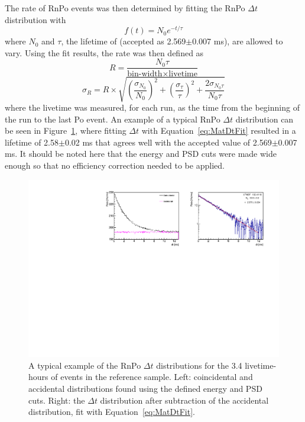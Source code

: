 The rate of RnPo events was then determined by fitting the RnPo $\Delta t$ distribution with
\begin{equation}
	f(t) = N_0e^{-t/\tau}
	\label{eq:MatDtFit}
\end{equation}
where $N_0$ and $\tau$, the lifetime of \Po (accepted as 2.569$\pm$0.007 ms), are allowed to vary. 
Using the fit results, the rate was then defined as
\begin{equation}
	R = \frac{N_0 \tau}{\textrm{bin-width}\times\textrm{livetime}}
\end{equation}
\begin{equation}
	\sigma_R = R \times \sqrt{  \left(\frac{\sigma_{N_0}}{N_0}\right)^2 + \left(\frac{\sigma_{\tau}}{\tau}\right)^2 + \frac{2\sigma_{N_{0}\tau}}{N_0\tau} }
\end{equation}
where the livetime was measured, for each run, as the time from the beginning of the run to the last Po event. 
An example of a typical RnPo $\Delta t$ distribution can be seen in Figure~\ref{fig:rnpodttimebin23s2}, where fitting $\Delta t$ with Equation~\ref{eq:MatDtFit} resulted in a \Po lifetime of 2.58$\pm$0.02 ms that agrees well with the accepted value of 2.569$\pm$0.007 ms. It should be noted here that the energy and PSD cuts were made wide enough so that no efficiency correction needed to be applied.

\begin{figure}[H]
	\centering
	\includegraphics[width=1.\linewidth]{"tex/6-ac227-images/BNL/RnPoDt_TimeBin23_S2"}
	\caption{A typical example of the RnPo $\Delta t$ distributions for the 3.4 livetime-hours of events in the reference sample. Left: coincidental and accidental distributions found using the defined energy and PSD cuts. Right: the $\Delta t$ distribution after subtraction of the accidental distribution, fit with Equation~\ref{eq:MatDtFit}.}
	\label{fig:rnpodttimebin23s2}
\end{figure}

